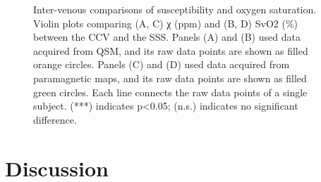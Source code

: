 \documentclass[
sn-nature
]{sn-jnl}
\begin{document}
\begin{figure}[H]


\caption{\label{fig-regionplot}Inter-venous comparisons of
susceptibility and oxygen saturation. Violin plots comparing (A, C) χ
(ppm) and (B, D) SvO2 (\%) between the CCV and the SSS. Panels (A) and
(B) used data acquired from QSM, and its raw data points are shown as
filled orange circles. Panels (C) and (D) used data acquired from
paramagnetic maps, and its raw data points are shown as filled green
circles. Each line connects the raw data points of a single subject.
(***) indicates p\textless0.05; (n.s.) indicates no significant
difference.}

\end{figure}%

\section{Discussion}\label{sec-discussion}
\end{document}
